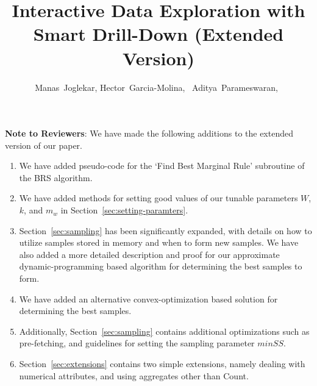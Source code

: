 \documentclass[10pt,journal,compsoc]{IEEEtran}
\begin{document}
\textbf{Note to Reviewers}: We have made the following additions to the extended version of our paper.

\begin{enumerate}
\item We have added pseudo-code for the `Find Best Marginal Rule' subroutine of the BRS algorithm.
\item We have added methods for setting good values of our tunable parameters $W$, $k$, and $m_w$ in Section~\ref{sec:setting-paramters}.
\item Section~\ref{sec:sampling} has been significantly expanded, with details on how to utilize samples stored in memory and when to form new samples. We have also added a more detailed description and proof for our approximate dynamic-programming based algorithm for determining the best samples to form.
\item We have added an alternative convex-optimization based solution for determining the best samples.
\item Additionally, Section~\ref{sec:sampling} contains additional optimizations such as pre-fetching, and guidelines for setting the sampling parameter $minSS$. 
\item Section~\ref{sec:extensions} contains two simple extensions, namely dealing with numerical attributes, and using aggregates other than Count. 
\end{enumerate}

\newpage


\title{Interactive Data Exploration with Smart Drill-Down (Extended Version)}

\author{Manas~Joglekar,
        Hector~Garcia-Molina,~
        Aditya~Parameswaran,~
}%
\end{document}
